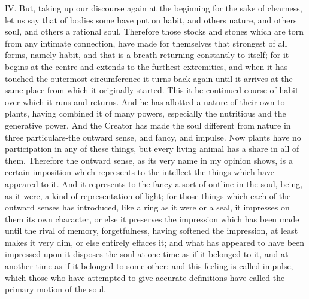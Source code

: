 IV. But, taking up our discourse again at the beginning for the sake of clearness, let us say that of
bodies some have put on habit, and others nature, and others soul, and others a rational soul.
Therefore those stocks and stones which are torn from any intimate connection, have made for
themselves that strongest of all forms, namely habit, and that is a breath returning constantly to
itself; for it begins at the centre and extends to the furthest extremities, and when it has touched
the outermost circumference it turns back again until it arrives at the same place from which it
originally started. This it he continued course of habit over which it runs and returns. And he has
allotted a nature of their own to plants, having combined it of many powers, especially the nutritious
and the generative power. And the Creator has made the soul different from nature in three
particulars-the outward sense, and fancy, and impulse. Now plants have no participation in any of
these things, but every living animal has a share in all of them. Therefore the outward sense, as its
very name in my opinion shows, is a certain imposition which represents to the intellect the things
which have appeared to it. And it represents to the fancy a sort of outline in the soul, being, as it
were, a kind of representation of light; for those things which each of the outward senses has
introduced, like a ring as it were or a seal, it impresses on them its own character, or else it
preserves the impression which has been made until the rival of memory, forgetfulness, having
softened the impression, at least makes it very dim, or else entirely effaces it; and what has
appeared to have been impressed upon it disposes the soul at one time as if it belonged to it, and
at another time as if it belonged to some other: and this feeling is called impulse, which those who
have attempted to give accurate definitions have called the primary motion of the soul.

